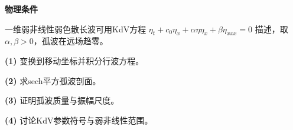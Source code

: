\textbf{物理条件}\par 一维弱非线性弱色散长波可用KdV方程 \(\eta_t+c_0\eta_x+\alpha\eta\eta_x+\beta\eta_{xxx}=0\) 描述，取 \(\alpha,\beta>0\)，孤波在远场趋零。
\par\noindent\textbf{(1)} 变换到移动坐标并积分行波方程。
\par\noindent\textbf{(2)} 求sech平方孤波剖面。
\par\noindent\textbf{(3)} 证明孤波质量与振幅尺度。
\par\noindent\textbf{(4)} 讨论KdV参数符号与弱非线性范围。
